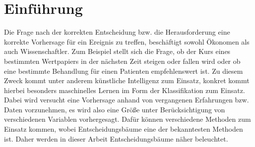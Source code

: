 \chapter{Einführung}
\label{einfuehrung}

Die Frage nach der korrekten Entscheidung bzw. die Herausforderung eine korrekte Vorhersage für ein Ereignis zu treffen, beschäftigt sowohl Ökonomen als auch Wissenschaftler. Zum Beispiel stellt sich die Frage, ob der Kurs eines bestimmten Wertpapiers in der nächsten Zeit steigen oder fallen wird oder ob eine bestimmte Behandlung für einen Patienten empfehlenswert ist. \autocite{QuinlanDecisionTrees}
Zu diesem Zweck kommt unter anderem künstliche Intelligenz zum Einsatz, konkret kommt hierbei besonders maschinelles Lernen im Form der Klassifikation zum Einsatz. \autocite{QuinlanID3} Dabei wird versucht eine Vorhersage anhand von vergangenen Erfahrungen bzw. Daten vorzunehmen, es wird also eine Größe unter Berücksichtigung von verschiedenen Variablen vorhergesagt. Dafür können verschiedene Methoden zum Einsatz kommen, wobei Entscheidungsbäume eine der bekanntesten Methoden ist. Daher werden in dieser Arbeit Entscheidungsbäume näher beleuchtet.